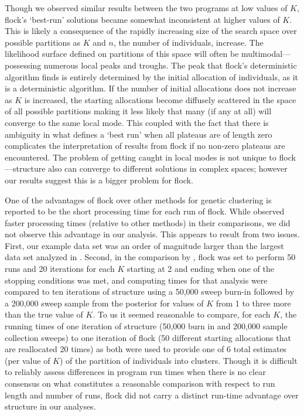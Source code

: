 Though we observed similar results
between the two programs at low values of $K$, {\sc flock}'s `best-run' solutions became somewhat inconsistent at higher values of $K$.
This is likely a consequence of the rapidly increasing size of the search space over possible 
partitions as $K$ and $n$, the number of individuals, increase. 
The likelihood surface defined on partitions of this space will often
be multimodal---possessing numerous local peaks and troughs.
The peak that  {\sc flock}'s deterministic algorithm finds is entirely determined by the initial allocation of 
individuals, as it is a deterministic algorithm.
If the number of initial allocations does not increase
as $K$ is increased, the starting allocations become diffusely scattered in the space of all
possible partitions making it less likely that many (if any at all) will converge to the same local mode. This coupled with the fact that there is 
ambiguity in what defines a `best run' when all plateaus are of length zero complicates the interpretation
of results from {\sc flock} if no non-zero plateaus are encountered. The problem of getting 
caught in local modes is not unique to {\sc flock}---{\sc structure} also can converge to 
different solutions in complex spaces; however our results suggest this is a bigger problem for {\sc flock}. 

 
One of the advantages of {\sc flock} over other methods for genetic clustering
is reported to be the short processing time for each run of {\sc flock}.
While \citet{Duc&Tur2012} observed faster processing times (relative to other methods) in their 
comparisons, we did not observe this advantage in our analysis. This appears to result from two issues. First,
our example data set was an order of magnitude larger than the largest data set analyzed in \citet{Duc&Tur2012}.  
Second, in the comparison by \citet{Duc&Tur2012}, 
{\sc flock} was set to perform 50 runs and 20 iterations for each $K$ starting at 2 and ending when 
one of the stopping conditions was met, and computing times for that analysis were compared to ten iterations of {\sc structure} using 
a 50,000 sweep burn-in followed 
by a 200,000 sweep sample from the posterior for values of $K$ from 1 to three more than the true 
value of $K$. 
To us it seemed reasonable to compare, for each $K$, the running times of one iteration of {\sc structure} (50,000 
burn in and 200,000 sample collection sweeps)
to one iteration of {\sc flock} (50 different starting allocations that are reallocated 20 times) 
as both were used to provide one of 6 total estimates (per value of $K$) of the partition of individuals into 
clusters. Though
it is difficult to reliably assess differences in program run times when there is no clear consensus on what 
constitutes a reasonable comparison with respect to run length and number of runs, {\sc flock} did not carry a distinct run-time advantage over {\sc structure} in our analyses.

